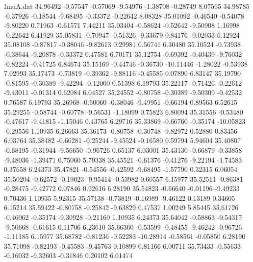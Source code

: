 \begin{filecontents}{ImuA.dat}
  34.96492   -0.57547   -0.57069   -9.54976   -1.38708   -0.28749    8.07565
  34.98785   -0.37926   -0.18544   -9.68495   -0.33372   -0.22642    8.08328
  35.01092   -0.46540   -0.54078   -9.80220    0.71963   -0.61571    7.44211
  35.03404   -0.58624   -0.52642   -9.50908    1.16998   -0.22642    6.41929
  35.05831   -0.70947   -0.51326   -9.33679    0.84176   -0.02033    6.12924
  35.08108   -0.87817   -0.38046   -9.82613    0.29981    0.56741    6.30480
  35.10524   -0.73938   -0.38644   -9.20878   -0.33372    0.47581    6.70171
  35.12754   -0.69392   -0.40439   -9.76032   -0.82224   -0.41725    6.84674
  35.15169   -0.44746   -0.36730  -10.11446   -1.28022   -0.53938    7.02993
  35.17473   -0.73819   -0.39362   -9.88116   -0.45585    0.07890    6.83147
  35.19790   -0.81595   -0.30389   -9.42294   -0.12000    0.51398    6.19793
  35.22117   -0.71426   -0.22612   -9.43011   -0.01314    0.62084    6.04527
  35.24552   -0.80758   -0.30389   -9.50309   -0.42532    0.76587    6.19793
  35.26968   -0.60060   -0.38046   -9.49951   -0.66194    0.89563    6.52615
  35.29255   -0.58744   -0.60778   -9.56531   -1.18099    0.75823    6.80094
  35.31556   -0.53480   -0.47617   -9.41815   -1.15046    0.43765    6.29716
  35.33869   -0.66760   -0.35174  -10.05823   -0.29556    1.10935    6.26663
  35.36173   -0.80758   -0.30748   -9.82972    0.52880    0.83456    6.03764
  35.38482   -0.66281   -0.25244   -9.45524   -0.16580    0.59794    5.94604
  35.40807   -0.68195   -0.31944   -9.56650   -0.96726    0.65137    6.03001
  35.43130   -0.66879   -0.33858   -9.48036   -1.39471    0.75060    5.79338
  35.45521   -0.61376   -0.41276   -9.22194   -1.74583    0.37658    6.24373
  35.47821   -0.54556   -0.42592   -9.68495   -1.57790    0.32315    6.06054
  35.50204   -0.62572   -0.19023   -9.95414   -0.53982    0.60557    6.15977
  35.52511   -0.86381   -0.28475   -9.42772    0.07846    0.92616    6.28190
  35.54823   -0.66640   -0.01196   -9.49233    0.70436    1.10935    5.92315
  35.57138   -0.73819   -0.16989   -9.46122    0.13189    0.34605    6.15214
  35.59422   -0.80758   -0.25842   -9.63829    0.47537    1.00249    5.85445
  35.61726   -0.46062   -0.35174   -9.30928   -0.21160    1.10935    6.24373
  35.64042   -0.58863   -0.54317   -9.50668   -0.61615    0.11706    6.23610
  35.66360   -0.53599   -0.48455   -9.46242   -0.96726   -1.11185    6.15977
  35.68782   -0.81236   -0.52283  -10.28914   -0.58561   -0.05850    6.28190
  35.71098   -0.82193   -0.45583   -9.45763    0.10899    0.81166    6.00711
  35.73433   -0.55633   -0.16032   -9.32603   -0.31846    0.20102    6.01474

\end{filecontents}
